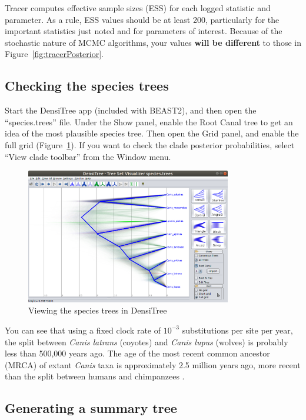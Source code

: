 \documentclass[12pt]{article}
\begin{document}
Tracer computes effective sample sizes (ESS) for each logged statistic and
parameter. As a rule, ESS values should be at least 200, particularly for
the important statistics just noted and for parameters of interest. Because of the stochastic
nature of MCMC algorithms, your values \textbf{will be different} to those in
Figure~\ref{fig:tracerPosterior}.

\subsection{Checking the species trees}
\label{subsec:checkTrees}

Start the DensiTree app (included with BEAST2), and then open the
``species.trees'' file. Under the Show panel, enable the Root Canal tree to
get an idea of the most plausible species tree. Then open the Grid panel, and
enable the full grid (Figure~\ref{fig:densitree}). If you want to check the
clade posterior probabilities, select ``View clade toolbar'' from the Window menu.

\begin{figure}[htb!]
\centering
\includegraphics[width=0.8\textwidth]{figures/densitree.png}
\caption
{Viewing the species trees in DensiTree}
\label{fig:densitree}
\end{figure}

You can see that using a fixed clock rate of $10^{-3}$ substitutions per site
per year, the split between \textit{Canis latrans} (coyotes) and \textit{Canis lupus}
(wolves) is probably less than 500,000 years ago. The age of the most
recent common ancestor (MRCA) of extant \textit{Canis} taxa is approximately 2.5 million
years ago, more recent than the split between humans and chimpanzees \citep{PradoMartinez2013}.

\clearpage

\subsection{Generating a summary tree}
\label{subsec:makeSummaryTree}
\end{document}
